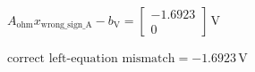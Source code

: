 \documentclass[border=12pt]{standalone}
\begin{document}
\color{weekcoral}
\parbox{14cm}{\centering $\displaystyle A_{\mathrm{ohm}}x_{\mathrm{wrong\_sign\_A}}-b_{\mathrm V}=\begin{bmatrix}-1.6923\\0\end{bmatrix}\,\mathrm V$}
\vspace{4pt}
\parbox{14cm}{\centering $\displaystyle \text{correct left-equation mismatch}=-1.6923\,\mathrm V$}
\end{document}
